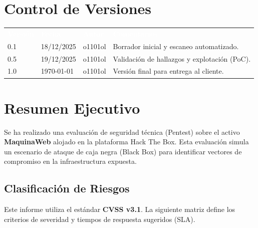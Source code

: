 \documentclass[a4paper]{article}
\newcommand{\miUser}{o1101ol} %
\newcommand{\maquinaNombre}{MaquinaWeb} %
\newcommand{\fecha}{\today} %
\begin{document}
\clearpage
{
  \hypersetup{linkcolor=black}
  \label{sec:toc}
  \tableofcontents
}
\clearpage

\section*{Control de Versiones}
\begin{table}[h]
    \centering
    \begin{tabularx}{\textwidth}{l l l X}
        \rowcolor{primaryDark}\textcolor{white}{\textbf{Versión}} & 
        \textcolor{white}{\textbf{Fecha}} & 
        \textcolor{white}{\textbf{Autor}} & 
        \textcolor{white}{\textbf{Comentarios}} \\

        0.1 & 
        18/12/2025 & 
        \miUser & 
        Borrador inicial y escaneo automatizado. \\

        0.5 & 
        19/12/2025 & 
        \miUser & 
        Validación de hallazgos y explotación (PoC). \\

        1.0 & 
        \fecha & 
        \miUser & 
        Versión final para entrega al cliente. \\
    \end{tabularx}
\end{table}
\clearpage

\section*{Resumen Ejecutivo}
\label{sec:resumen}

Se ha realizado una evaluación de seguridad técnica (Pentest) sobre el activo \textbf{\maquinaNombre} alojado en la plataforma Hack The Box. Esta evaluación simula un escenario de ataque de caja negra (Black Box) para identificar vectores de compromiso en la infraestructura expuesta.

\subsection*{Clasificación de Riesgos}
Este informe utiliza el estándar \textbf{CVSS v3.1}. La siguiente matriz define los criterios de severidad y tiempos de respuesta sugeridos (SLA).
\end{document}
